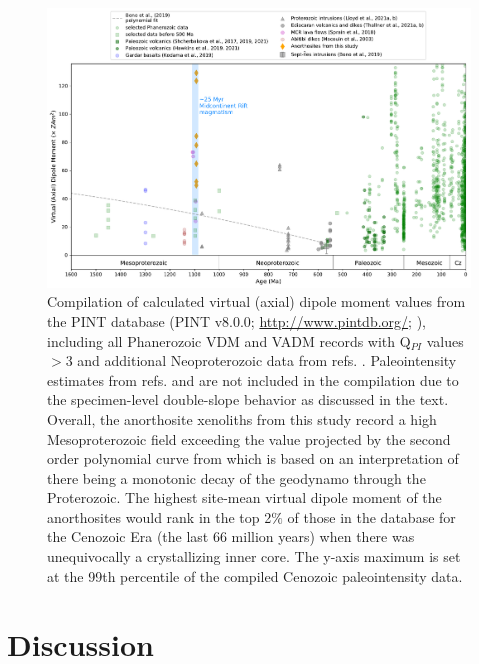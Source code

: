 \begin{figure}[h!]
\noindent\includegraphics[width=\textwidth]{figure/Zhang2022/PINT_compilation.pdf}
\centering
\caption{\footnotesize{Compilation of calculated virtual (axial) dipole moment values from the PINT database (PINT v8.0.0; \url{http://www.pintdb.org/}; \citealp{Bono2022a}), including all Phanerozoic VDM and VADM records with Q$_{PI}$ values $>$3 and additional Neoproterozoic data from refs. \citealp{Lloyd2021a, Lloyd2021b, Thallner2021a, Thallner2021b}. Paleointensity estimates from refs. \citealp{Pesonen1983a} and \citealp{Kulakov2013a} are not included in the compilation due to the specimen-level double-slope behavior as discussed in the text. Overall, the anorthosite xenoliths from this study record a high Mesoproterozoic field exceeding the value projected by the second order polynomial curve from \citealp{Bono2019a} which is based on an interpretation of there being a monotonic decay of the geodynamo through the Proterozoic. The highest site-mean virtual dipole moment of the anorthosites would rank in the top 2$\%$ of those in the database for the Cenozoic Era (the last 66 million years) when there was unequivocally a crystallizing inner core. The y-axis maximum is set at the 99th percentile of the compiled Cenozoic paleointensity data.}}
\label{fig:PINT_compilation}
\end{figure}

\section{Discussion}

